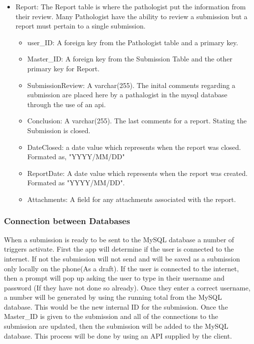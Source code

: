 \documentclass[onecolumn, draftclsnofoot,10pt, compsoc]{IEEEtran}
\begin{document}
\begin{itemize}
\item Report:\newline
The Report table is where the pathologist put the information from their review. Many Pathologist have the ability to review a submission but a report must pertain to a single submission.
\begin{itemize}
\item user\_ID: A foreign key from the Pathologist table and a primary key.
\item Master\_ID: A foreign key from the Submission Table and the other primary key for Report.
\item SubmissionReview: A varchar(255). The inital comments regarding a submission are placed here by a pathalogist in the mysql database through the use of an api.
\item Conclusion: A varchar(255). The last comments for a report. Stating the Submission is closed.
\item DateClosed: a date value which represents when the report was closed. Formated as, "YYYY/MM/DD"
\item ReportDate: A date value which represents when the report was created. Formated as "YYYY/MM/DD".
\item Attachments: A field for any attachments associated with the report.
\end{itemize}

\end{itemize}

\subsubsection{Connection between Databases}
When a submission is ready to be sent to the MySQL database a number of triggers activate. First the app will determine if the user is connected to the internet. If not the submission will not send and will be saved as a submission only locally on the phone(As a draft). If the user is connected to the internet, then a prompt will pop up asking the user to type in their username and password (If they have not done so already). Once they enter a correct username, a number will be generated by using the running total from the MySQL database. This would be the new internal ID for the submission. Once the Master\_ID is given to the submission and all of the connections to the submission are updated, then the submission will be added to the MySQL database. This process will be done by using an API supplied by the client.
\end{document}
